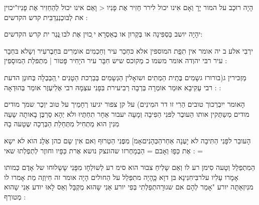 \documentclass[14pt, a5paper, twoside, extrafontsizes]{memoir}
\begin{document}
\begin{hebrew}
הָיָה
רוּכָב על המור יָרָ\hdot
 וְאָם אִינו יכול לירר \hdot
חַזִיר אֶת פָנִיו < וָאַם אינו יכול לְהַחַזִיר אֶת
פָנִיו"יכוין את לְבּוכְנְנְדַבִּית קדש הקדשים :

יהָיָה יושב בַּסְפִּינָה או בְּקְרון \hdot
 או בְאַסְרָא י
 ְכוּין אֶת לבו ְּנְגֶר ית קרש הקדשים:

 ירְבִי
אלע ב יה אומר אין תִפְַת המוספין
אלא כּחְכַר עיר \hdot
וְחַכְמִים אומְרִים בּחַבֶרעִיר
וְשָלא בּחְבָר עיר \hdot
 רבּי יהוְדה אומר משמו
כ מַקוכס שיש חִבָּר עיר \hdot
 היָחִיר פָּטור
| מִתְפּלַת הַמוסָפִין :


 מַזְכּירין ג(בורורז גשָמִים בֶּתְִית
הַמְתִים \hdot
 ושואָלין הַגְשָמִים בְּבַרְכת הַטָנִים י
ְהַבְבְלָה בְּחונְן הדעת \hdot
 רבי עַקִיבָא אוּמַר
אומְרָה בְּרְבָה רְבִיעירת בִּפָנִי עצְמָהּ \hdot
 רבי
 אֶלִיעְזֶר אומַר בְּהוּדְאָה : :

 הָאומר ייִבְרְכוך
טובים הַרִי זו דר המִינִים) על קן צפור יגיעו
רְחָמַיך \hdot
 על טוב יוְכֶר שמך \hdot
 מודים מודים
מְשַתֶּקין אותו \hdot
 הַעובֶר לְפּנִי הַפִיבָה וְמָעָה \hdot
יעבור אַחָר תִחְתֶּיוּ \hdot
 ולא יְהָא סַרְבֶּן בָאותָה
שָעַה \hdot
 מִנִין הוא מַתְחִיל מִתְּחַלַת הַבְּרְכָה
 שֶטָעה בָהּ

הָעובַר לפָּנִי הַתִּיבָה לא יָעְנָה
אַחַרהַכְּהָנִיםאָמ] מִפֶּנִי הַטַרוּף \hdot
וְאם אִין שָם
כהן אֶלָנ הוא לא ישָא אֶת כַּפָוּ \hdot
 וְאָבם =
הַבְמָחֶרזו שהונצק נושא אֶרת כַּפָּיו וחוזֶר
לְתְפְלְתוּ שאי : =

הַמִתְפַלַל וְטָעה סִימן רע
לו \hdot
 וְאַם שָלִיחַ צבוּר הוא סימ רע לְשולְחָו \hdot
מִפָּנִי שָשָלוּחו של אָדֶם כְּמותו \hdot
 אָמָרו עָלִיו
עלרבִּיחִנִינָא בּן דוָא \hdot
 כָָּהָיָה מתִפַּלַל על
הַחולים \hdot
 הָיָה אומר זה חִיוְזֶה מַת \hdot
 אָמרו לו
מנִיִזְאַתָּה יורע "אָמַר לְהָם\hdot
אם שגוּרָהתְפַלְתִי
בְּפִי יורע אַנִי שָהוּא מְקְבָּל \hdot
 וְאַס לָאוּ\hdot
 יודע
אַנִי שָהוא מְטורְף :



\end{hebrew}
\end{document}
